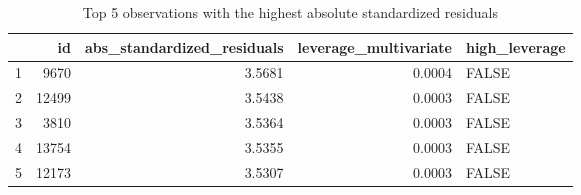 \begin{table}[ht]
\centering
\begin{tabular}{rrrrl}
  \hline
 & id & abs\_standardized\_residuals & leverage\_multivariate & high\_leverage \\ 
  \hline
1 &  9670 & 3.5681 & 0.0004 & FALSE \\ 
  2 & 12499 & 3.5438 & 0.0003 & FALSE \\ 
  3 &  3810 & 3.5364 & 0.0003 & FALSE \\ 
  4 & 13754 & 3.5355 & 0.0003 & FALSE \\ 
  5 & 12173 & 3.5307 & 0.0003 & FALSE \\ 
   \hline
\end{tabular}
\caption{Top 5 observations with the highest absolute standardized residuals} 
\label{tab:highest_standardized_residuals}
\end{table}

